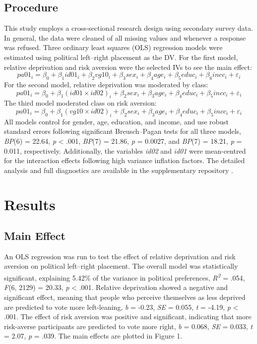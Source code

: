 \documentclass[stu,12pt]{apa7}
\begin{document}
\subsection{Procedure}

This study employs a cross-sectional research design using secondary survey data. In general, the data were cleaned of all missing values and whenever a response was refused. Three ordinary least squares (OLS) regression models were estimated using political left–right placement as the DV. For the first model, relative deprivation and risk aversion were the selected IVs to see the main effect:
\[pa01_i=\beta_0+\beta_1id01_i+\beta_2vg10_i+\beta_3sex_i+\beta_4age_i+\beta_5educ_i+ \beta_6incc_i+ \varepsilon_i\]
For the second model, relative deprivation was moderated by class:
\[pa01_i=\beta_0+\beta_1(id01 \times id02)_i+\beta_2sex_i+\beta_3age_i+\beta_4educ_i+\beta_5incc_i+  \varepsilon_i\]
The third model moderated class on risk aversion:
\[pa01_i=\beta_0+\beta_1(vg10 \times id02)_i+\beta_2sex_i+\beta_3age_i+\beta_4educ_i+ \beta_5incc_i+\varepsilon_i\]
All models control for gender, age, education, and income, and use robust standard errors following significant Breusch–Pagan tests for all three models, \textit{BP}(6) = 22.64, \textit{p} < .001, \textit{BP}(7) = 21.86, \textit{p} = 0.0027, and \textit{BP}(7) = 18.21, \textit{p} = 0.011, respectively. Additionally, the variables \textit{id02} and \textit{id01} were mean-centred for the interaction effects following high variance inflation factors. The detailed analysis and full diagnostics are available in the supplementary repository \parencite{zotero-item-1650}.

\section{Results}

\subsection{Main Effect}

An OLS regression was run to test the effect of relative deprivation and risk aversion on political left–right placement. The overall model was statistically significant, explaining 5.42\% of the variance in political preferences, \textit{R}\textit{\textsuperscript{2}} = .054, \textit{F}(6, 2129) = 20.33, \textit{p} < .001. Relative deprivation showed a negative and significant effect, meaning that people who perceive themselves as less deprived are predicted to vote more left-leaning, \textit{b} = -0.23, \textit{SE} = 0.055, \textit{t} = -4.19, \textit{p} < .001. The effect of risk aversion was positive and significant, indicating that more risk-averse participants are predicted to vote more right, \textit{b} = 0.068, \textit{SE} = 0.033, \textit{t} = 2.07, \textit{p} = .039. The main effects are plotted in Figure 1.
\end{document}
